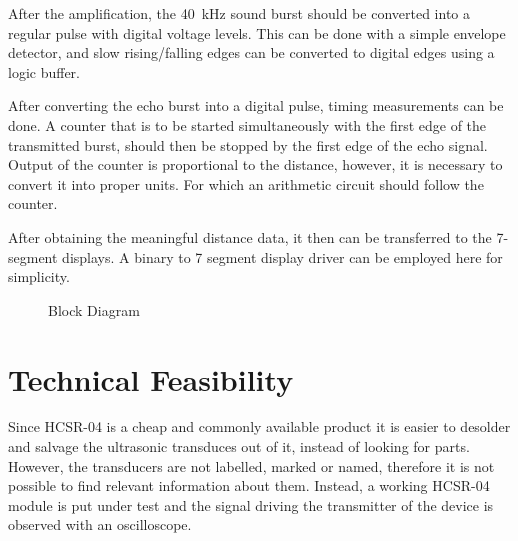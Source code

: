 \documentclass[12pt, a4paper]{article}
\begin{document}
        \bigskip
        After the amplification, the \SI{40}{\kilo\hertz} sound burst should be converted into a regular pulse with digital voltage levels. This can be done with a simple envelope detector, and slow rising/falling edges can be converted to digital edges using a logic buffer. 

        \bigskip
        After converting the echo burst into a digital pulse, timing measurements can be done. A counter that is to be started simultaneously with the first edge of the transmitted burst, should then be stopped by the first edge of the echo signal. Output of the counter is proportional to the distance, however, it is necessary to convert it into proper units. For which an arithmetic circuit should follow the counter.

        \bigskip
        After obtaining the meaningful distance data, it then can be transferred to the 7-segment displays. A binary to 7 segment display driver can be employed here for simplicity.

        \pagebreak
        \begin{landscape}\centering
            \vspace*{1.8cm}
            \begin{figure}[H]\centering
                \caption{Block Diagram}
            \end{figure}
        \end{landscape}
        \vfill
        \pagebreak


    \section{Technical Feasibility}

        Since HCSR-04 is a cheap and commonly available product it is easier to desolder and salvage the ultrasonic transduces out of it, instead of looking for parts. However, the transducers are not labelled, marked or named, therefore it is not possible to find relevant information about them. Instead, a working HCSR-04 module is put under test and the signal driving the transmitter of the device is observed with an oscilloscope. 
\end{document}
